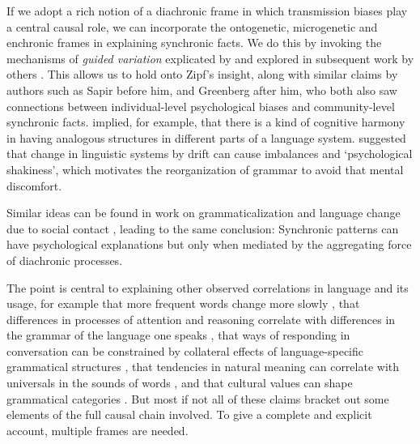 If we adopt a rich notion of a diachronic frame in which transmission 
biases play a central causal role, we can incorporate the ontogenetic, 
microgenetic and enchronic frames in explaining synchronic facts. We do this by invoking the mechanisms of \textit{guided variation} explicated by 
\citet{boyd_culture_1985,boyd_origin_2005} and explored in subsequent work by 
others \citep{kirby_function_1999,kirby_ug_2004,christiansen_language_2008,chater_language_2010}. This allows us to hold 
onto Zipf's insight, along with similar claims by authors such as 
Sapir before him, and Greenberg after him, who both also saw connections 
between individual-level psychological biases and community-level synchronic facts. \citet{greenberg_universals_1966} implied, for example, that there is a kind of cognitive 
harmony in having analogous structures in different parts of a language 
system. \citet[154--158]{sapir_language:_1921} suggested that change in linguistic 
systems by drift can cause imbalances and \textquoteleft psychological 
shakiness', which motivates the reorganization of grammar to avoid 
that mental discomfort. 



Similar ideas can be found in work on grammaticalization \citep{givon_syntax:_1984,bybee_language_2010} and language change due to social contact \citep{weinreich_languages_1953}, leading to the same conclusion: Synchronic patterns can have 
psychological explanations but only when mediated by the aggregating 
force of diachronic processes. 



The point is central to explaining other observed 
correlations in language and its usage, for example that more frequent words change more slowly 
\citep{pagel_frequency_2007}, that differences in processes of 
attention and reasoning correlate with differences in the grammar of the 
language one speaks \citep{whorf_language_1956,lucy_language_1992,slobin_thought_1996}, 
that ways of responding in conversation can be constrained by collateral 
effects of language-specific grammatical structures \citep{sidnell_language_2012}, that tendencies in natural meaning can correlate with universals in the sounds of words \citep{dingemanse_is_2013}, and that cultural values can shape grammatical categories \citep{hale_notes_1986,wierzbicka_semantics_1992,chafe_loci_2000,enfield_ethnosyntax:_2002,everett_cultural_2005,everett_language:_2012}. But most if not all of these claims bracket out some elements of the full 
causal chain involved. To give a complete and explicit account, multiple frames are needed.





 \newpage